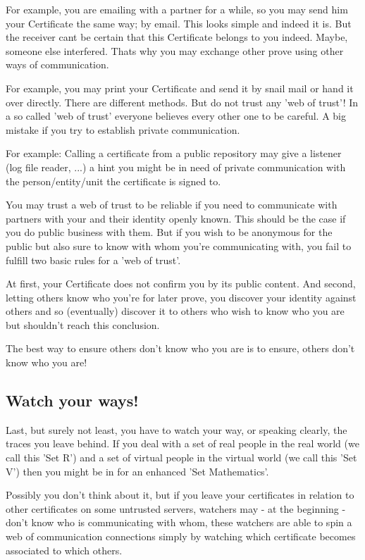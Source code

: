 \documentclass[twoside,a4paper,english,12pt,authoryear,openright]{book}
\begin{document}
For example, you are emailing with a partner for a while, so you may send him your Certificate the same way; by email. This looks simple and indeed it is. But the receiver cant be certain that this Certificate belongs to you indeed. Maybe, someone else interfered. Thats why you may exchange other prove using other ways of communication.

For example, you may print your Certificate and send it by snail mail or hand it over directly. There are different methods. But do not trust any 'web of trust'! In a so called 'web of trust' everyone believes every other one to be careful. A big mistake if you try to establish private communication.

For example: Calling a certificate from a public repository may give a listener (log file reader, ...) a hint you might be in need of private communication with the person/entity/unit the certificate is signed to.

You may trust a web of trust to be reliable if you need to communicate with partners with your and their identity openly known. This should be the case if you do public business with them. But if you wish to be anonymous for the public but also sure to know with whom you're communicating with, you fail to fulfill two basic rules for a 'web of trust'.

At first, your Certificate does not confirm you by its public content. And second, letting others know who you're for later prove, you discover your identity against others and so (eventually) discover it to others who wish to know who you are but shouldn't reach this conclusion.

The best way to ensure others don't know who you are is to ensure, others don't know who you are!

\subsection{Watch your ways!}

Last, but surely not least, you have to watch your way, or speaking clearly, the traces you leave behind. If you deal with a set of real people in the real world (we call this 'Set R')  and a set of virtual people in the virtual world (we call this 'Set V') then you might be in for an enhanced 'Set Mathematics'.

Possibly you don't think about it, but if you leave your certificates in relation to other certificates on some untrusted servers, watchers may - at the beginning - don't know who is communicating with whom, these watchers are able to spin a web of communication connections simply by watching which certificate becomes associated to which others.
\end{document}
